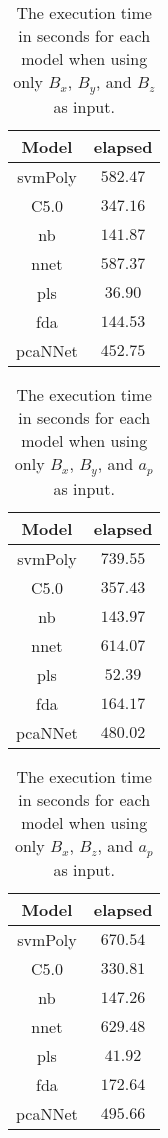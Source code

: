 \begin{table}[!ht]
	\centering
	\begin{tabular}{|c|c|}
		\hline
		Model & elapsed \\ \hline
		svmPoly & $582.47$ \\ \hline
		C5.0 & $347.16$ \\ \hline
		nb & $141.87$ \\ \hline
		nnet & $587.37$ \\ \hline
		pls & $36.90$ \\ \hline
		fda & $144.53$ \\ \hline
		pcaNNet & $452.75$ \\ \hline
	\end{tabular}
	\caption{The execution time in seconds for each model when using only $B_{x}$, $B_{y}$, and $B_{z}$ as input.}
	\label{tab:time:coord:total}
\end{table}

\begin{table}[!ht]
	\centering
	\begin{tabular}{|c|c|}
		\hline
		Model & elapsed \\ \hline
		svmPoly & $739.55$ \\ \hline
		C5.0 & $357.43$ \\ \hline
		nb & $143.97$ \\ \hline
		nnet & $614.07$ \\ \hline
		pls & $52.39$ \\ \hline
		fda & $164.17$ \\ \hline
		pcaNNet & $480.02$ \\ \hline
	\end{tabular}
	\caption{The execution time in seconds for each model when using only $B_{x}$, $B_{y}$, and $a_{p}$ as input.}
	\label{tab:time:xyap:total}
\end{table}

\begin{table}[!ht]
	\centering
	\begin{tabular}{|c|c|}
		\hline
		Model & elapsed \\ \hline
		svmPoly & $670.54$ \\ \hline
		C5.0 & $330.81$ \\ \hline
		nb & $147.26$ \\ \hline
		nnet & $629.48$ \\ \hline
		pls & $41.92$ \\ \hline
		fda & $172.64$ \\ \hline
		pcaNNet & $495.66$ \\ \hline
	\end{tabular}
	\caption{The execution time in seconds for each model when using only $B_{x}$, $B_{z}$, and $a_{p}$ as input.}
	\label{tab:time:xzap:total}
\end{table}

